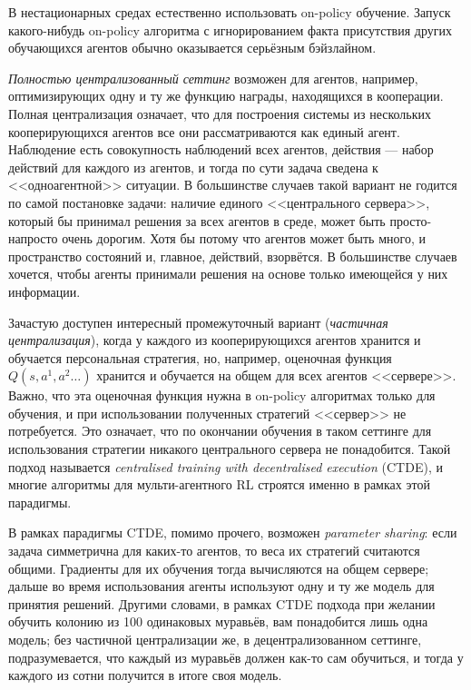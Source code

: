 В нестационарных средах естественно использовать on-policy обучение. Запуск какого-нибудь on-policy алгоритма с игнорированием факта присутствия других обучающихся агентов обычно оказывается серьёзным бэйзлайном.

\emph{Полностью централизованный сеттинг} возможен для агентов, например, оптимизирующих одну и ту же функцию награды, находящихся в кооперации. Полная централизация означает, что для построения системы из нескольких кооперирующихся агентов все они рассматриваются как единый агент. Наблюдение есть совокупность наблюдений всех агентов, действия --- набор действий для каждого из агентов, и тогда по сути задача сведена к <<одноагентной>> ситуации. В большинстве случаев такой вариант не годится по самой постановке задачи: наличие единого <<центрального сервера>>, который бы принимал решения за всех агентов в среде, может быть просто-напросто очень дорогим. Хотя бы потому что агентов может быть много, и пространство состояний и, главное, действий, взорвётся. В большинстве случаев хочется, чтобы агенты принимали решения на основе только имеющейся у них информации.

Зачастую доступен интересный промежуточный вариант (\emph{частичная централизация}), когда у каждого из кооперирующихся агентов хранится и обучается персональная стратегия, но, например, оценочная функция $Q(s, a^1, a^2 \dots)$ хранится и обучается на общем для всех агентов <<сервере>>. Важно, что эта оценочная функция нужна в on-policy алгоритмах только для обучения, и при использовании полученных стратегий <<сервер>> не потребуется. Это означает, что по окончании обучения в таком сеттинге для использования стратегии никакого центрального сервера не понадобится. Такой подход называется \emph{centralised training with decentralised execution} (CTDE), и многие алгоритмы для мульти-агентного RL строятся именно в рамках этой парадигмы.

В рамках парадигмы CTDE, помимо прочего, возможен \emph{parameter sharing}: если задача симметрична для каких-то агентов, то веса их стратегий считаются общими. Градиенты для их обучения тогда вычисляются на общем сервере; дальше во время использования агенты используют одну и ту же модель для принятия решений. Другими словами, в рамках CTDE подхода при желании обучить колонию из 100 одинаковых муравьёв, вам понадобится лишь одна модель; без частичной централизации же, в децентрализованном сеттинге, подразумевается, что каждый из муравьёв должен как-то сам обучиться, и тогда у каждого из сотни получится в итоге своя модель.

